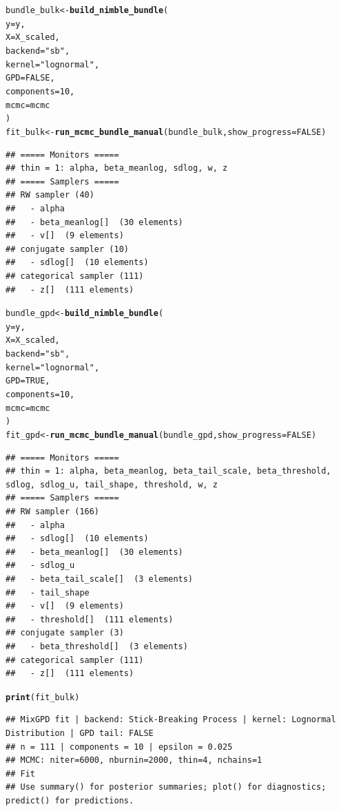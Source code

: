 \documentclass[article]{jss}\usepackage[]{graphicx}\usepackage[]{xcolor}
\makeatletter
\newcommand{\hlnum}[1]{\textcolor[rgb]{0.686,0.059,0.569}{#1}}%
\newcommand{\hlsng}[1]{\textcolor[rgb]{0.192,0.494,0.8}{#1}}%
\newcommand{\hldef}[1]{\textcolor[rgb]{0.345,0.345,0.345}{#1}}%
\newcommand{\hlkwb}[1]{\textcolor[rgb]{0.69,0.353,0.396}{#1}}%
\newcommand{\hlkwc}[1]{\textcolor[rgb]{0.333,0.667,0.333}{#1}}%
\newcommand{\hlkwd}[1]{\textcolor[rgb]{0.737,0.353,0.396}{\textbf{#1}}}%
\newenvironment{kframe}{%
 \def\at@end@of@kframe{}%
 \ifinner\ifhmode%
  \def\at@end@of@kframe{\end{minipage}}%
  \begin{minipage}{\columnwidth}%
 \fi\fi%
 \def\FrameCommand##1{\hskip\@totalleftmargin \hskip-\fboxsep
 \colorbox{shadecolor}{##1}\hskip-\fboxsep
     \hskip-\linewidth \hskip-\@totalleftmargin \hskip\columnwidth}%
 \MakeFramed {\advance\hsize-\width
   \@totalleftmargin\z@ \linewidth\hsize
   \@setminipage}}%
 {\par\unskip\endMakeFramed%
 \at@end@of@kframe}
\newenvironment{knitrout}{}{} %
\makeatother
\begin{document}
\begin{knitrout}
\begin{kframe}
\begin{alltt}
\hldef{bundle_bulk} \hlkwb{<-} \hlkwd{build_nimble_bundle}\hldef{(}
  \hlkwc{y} \hldef{= y,}
  \hlkwc{X} \hldef{= X_scaled,}
  \hlkwc{backend} \hldef{=} \hlsng{"sb"}\hldef{,}
  \hlkwc{kernel} \hldef{=} \hlsng{"lognormal"}\hldef{,}
  \hlkwc{GPD} \hldef{=} \hlnum{FALSE}\hldef{,}
  \hlkwc{components} \hldef{=} \hlnum{10}\hldef{,}
  \hlkwc{mcmc} \hldef{= mcmc}
\hldef{)}
\hldef{fit_bulk} \hlkwb{<-} \hlkwd{run_mcmc_bundle_manual}\hldef{(bundle_bulk,} \hlkwc{show_progress} \hldef{=} \hlnum{FALSE}\hldef{)}
\end{alltt}
\begin{verbatim}
## ===== Monitors =====
## thin = 1: alpha, beta_meanlog, sdlog, w, z
## ===== Samplers =====
## RW sampler (40)
##   - alpha
##   - beta_meanlog[]  (30 elements)
##   - v[]  (9 elements)
## conjugate sampler (10)
##   - sdlog[]  (10 elements)
## categorical sampler (111)
##   - z[]  (111 elements)
\end{verbatim}
\begin{alltt}
\hldef{bundle_gpd} \hlkwb{<-} \hlkwd{build_nimble_bundle}\hldef{(}
  \hlkwc{y} \hldef{= y,}
  \hlkwc{X} \hldef{= X_scaled,}
  \hlkwc{backend} \hldef{=} \hlsng{"sb"}\hldef{,}
  \hlkwc{kernel} \hldef{=} \hlsng{"lognormal"}\hldef{,}
  \hlkwc{GPD} \hldef{=} \hlnum{TRUE}\hldef{,}
  \hlkwc{components} \hldef{=} \hlnum{10}\hldef{,}
  \hlkwc{mcmc} \hldef{= mcmc}
\hldef{)}
\hldef{fit_gpd} \hlkwb{<-} \hlkwd{run_mcmc_bundle_manual}\hldef{(bundle_gpd,} \hlkwc{show_progress} \hldef{=} \hlnum{FALSE}\hldef{)}
\end{alltt}
\begin{verbatim}
## ===== Monitors =====
## thin = 1: alpha, beta_meanlog, beta_tail_scale, beta_threshold, sdlog, sdlog_u, tail_shape, threshold, w, z
## ===== Samplers =====
## RW sampler (166)
##   - alpha
##   - sdlog[]  (10 elements)
##   - beta_meanlog[]  (30 elements)
##   - sdlog_u
##   - beta_tail_scale[]  (3 elements)
##   - tail_shape
##   - v[]  (9 elements)
##   - threshold[]  (111 elements)
## conjugate sampler (3)
##   - beta_threshold[]  (3 elements)
## categorical sampler (111)
##   - z[]  (111 elements)
\end{verbatim}
\begin{alltt}
\hlkwd{print}\hldef{(fit_bulk)}
\end{alltt}
\begin{verbatim}
## MixGPD fit | backend: Stick-Breaking Process | kernel: Lognormal Distribution | GPD tail: FALSE
## n = 111 | components = 10 | epsilon = 0.025
## MCMC: niter=6000, nburnin=2000, thin=4, nchains=1 
## Fit
## Use summary() for posterior summaries; plot() for diagnostics; predict() for predictions.

\end{verbatim}
\end{kframe}
\end{knitrout}
\end{document}
